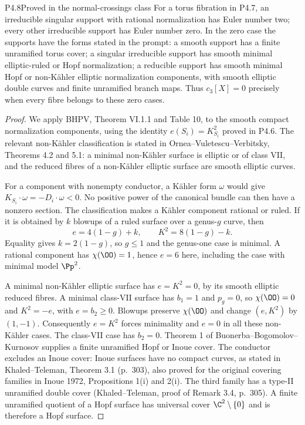 \begin{statement}{P4.8}{Proved in the normal-crossings class}
For a torus fibration in P4.7, an irreducible singular support with
rational normalization has Euler number two; every other irreducible
support has Euler number zero. In the zero case the supports have the
forms stated in the prompt: a smooth support has a finite unramified
torus cover; a singular irreducible support has smooth minimal
elliptic-ruled or Hopf normalization; a reducible support has smooth
minimal Hopf or non-Kähler elliptic normalization components, with
smooth elliptic double curves and finite unramified branch maps.
Thus $c_3[X]=0$ precisely when every fibre belongs to these zero cases.
\end{statement}
\begin{proof}
We apply BHPV, Theorem VI.1.1 and Table 10, to the smooth compact
normalization components, using the identity $e(S_i)=K_{S_i}^2$ proved
in P4.6. The relevant non-Kähler classification is stated in
Ornea--Vuletescu--Verbitsky, Theorems 4.2 and 5.1: a minimal non-Kähler
surface is elliptic or of class VII, and the reduced fibres of a
non-Kähler elliptic surface are smooth elliptic curves.

For a component with nonempty conductor, a Kähler form $\omega$ would
give $K_{S_i}\cdot\omega=-D_i\cdot\omega<0$. No positive power of
the canonical bundle can then have a nonzero section. The classification
makes a Kähler component rational or ruled. If it is obtained by $k$
blowups of a ruled surface over a genus-$g$ curve, then
\[
 e=4(1-g)+k,\qquad K^2=8(1-g)-k.
\]
Equality gives $k=2(1-g)$, so $g\le1$ and the genus-one case is minimal.
A rational component has $\chi(\OO)=1$, hence $e=6$ here, including
the case with minimal model $\Pp^2$.

A minimal non-Kähler elliptic surface has $e=K^2=0$, by its smooth
elliptic reduced fibres. A minimal class-VII surface has $b_1=1$ and
$p_g=0$, so $\chi(\OO)=0$ and $K^2=-e$, with $e=b_2\ge0$.
Blowups preserve $\chi(\OO)$ and change $(e,K^2)$ by $(1,-1)$.
Consequently $e=K^2$ forces minimality and $e=0$ in all these
non-Kähler cases. The class-VII case has $b_2=0$. Theorem 1 of
Buonerba--Bogomolov--Kurnosov supplies a finite unramified Hopf or
Inoue cover. The conductor excludes an Inoue cover: Inoue surfaces
have no compact curves, as stated in Khaled--Teleman, Theorem 3.1
(p.~303), also proved for the original covering families in Inoue
1972, Propositions 1(i) and 2(i). The third family has a type-II
unramified double cover (Khaled--Teleman, proof of Remark 3.4,
p.~305). A finite unramified quotient of a Hopf surface has universal
cover $\C^2\setminus\{0\}$ and is therefore a Hopf surface.


\end{proof}
